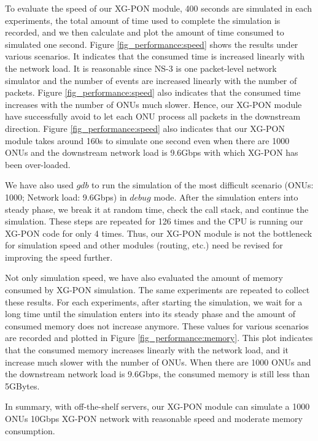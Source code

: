 To evaluate the speed of our XG-PON module, 400 seconds are
simulated in each experiments, the total amount of time used to
complete the simulation is recorded, and we then calculate and
plot the amount of time consumed to simulated one second. Figure
\ref{fig_performance:speed} shows the results under various
scenarios. It indicates that the consumed time is increased
linearly with the network load. It is reasonable since NS-3 is one
packet-level network simulator and the number of events are
increased linearly with the number of packets. Figure
\ref{fig_performance:speed} also indicates that the consumed time
increases with the number of ONUs much slower. Hence, our XG-PON
module have successfully avoid to let each ONU process all packets
in the downstream direction. Figure \ref{fig_performance:speed}
also indicates that our XG-PON module takes around 160s to
simulate one second even when there are 1000 ONUs and the
downstream network load is 9.6Gbps with which XG-PON has been
over-loaded.

We have also used $gdb$ to run the simulation of the most 
difficult scenario (ONUs: 1000; Network load: 9.6Gbps) in $debug$ mode.
After the simulation enters into steady phase, we break it at random time, 
check the call stack, and continue the simulation. These steps are repeated 
for 126 times and the CPU is running our XG-PON code for only 4 times. 
Thus, our XG-PON module is not the bottleneck for simulation speed 
and other modules (routing, etc.) need be revised for improving 
the speed further.



Not only simulation speed, we have also evaluated the amount of memory
consumed by XG-PON simulation. The same experiments are repeated
to collect these results. For each experiments, after starting the
simulation, we wait for a long time until the simulation enters
into its steady phase and the amount of consumed memory does not
increase anymore. These values for various scenarios are recorded
and plotted in Figure \ref{fig_performance:memory}. This plot
indicates that the consumed memory increases linearly with the
network load, and it increase much slower with the number of ONUs.
When there are 1000 ONUs and the downstream network load is
9.6Gbps, the consumed memory is still less than 5GBytes.


In summary, with off-the-shelf servers, our XG-PON module can
simulate a 1000 ONUs 10Gbps XG-PON network with reasonable speed
and moderate memory consumption.


\clearpage

